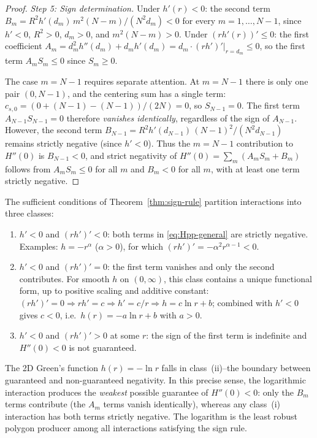 \begin{proof}
\emph{Step 5: Sign determination.}
Under $h'(r) < 0$: the second term
$B_m = R^2 h'(d_m)\,m^2(N{-}m)/(N^2 d_m) < 0$
for every $m = 1, \ldots, N-1$, since $h' < 0$, $R^2 > 0$, $d_m > 0$,
and $m^2(N{-}m) > 0$.
Under $(rh'(r))' \le 0$: the first coefficient
$A_m = d_m^2 h''(d_m) + d_m h'(d_m) = d_m \cdot (rh')'\big|_{r=d_m} \le 0$,
so the first term $A_m S_m \le 0$ since $S_m \ge 0$.

The case $m = N{-}1$ requires separate attention.
At $m = N{-}1$ there is only one pair $(0, N{-}1)$, and the
centering sum has a single term:
$c_{s,0} = (0 + (N{-}1) - (N{-}1))/(2N) = 0$,
so $S_{N-1} = 0$.  The first term $A_{N-1} S_{N-1} = 0$ therefore
\emph{vanishes identically}, regardless of the sign of $A_{N-1}$.
However, the second term
$B_{N-1} = R^2 h'(d_{N-1})\,(N{-}1)^2/(N^2 d_{N-1})$
remains strictly negative (since $h' < 0$).  Thus the $m = N{-}1$
contribution to $H''(0)$ is $B_{N-1} < 0$, and strict negativity
of $H''(0) = \sum_m (A_m S_m + B_m)$ follows from $A_m S_m \le 0$
for all $m$ and $B_m < 0$ for all $m$, with at least one term
strictly negative.
\end{proof}

\begin{remark}
\label{rem:borderline}
The sufficient conditions of Theorem~\ref{thm:sign-rule} partition
interactions into three classes:
\begin{enumerate}
  \item[(i)] $h' < 0$ and $(rh')' < 0$: both terms in
    \eqref{eq:Hpp-general} are strictly negative.
    Examples: $h = -r^\alpha$ ($\alpha > 0$), for which
    $(rh')' = -\alpha^2 r^{\alpha-1} < 0$.
  \item[(ii)] $h' < 0$ and $(rh')' = 0$: the first term vanishes
    and only the second contributes.  For smooth $h$ on $(0,\infty)$,
    this class contains a unique functional form, up to positive
    scaling and additive constant:
    $(rh')' = 0 \Rightarrow rh' = c \Rightarrow h' = c/r
    \Rightarrow h = c\ln r + b$; combined with $h' < 0$ gives
    $c < 0$, i.e.\ $h(r) = -a\ln r + b$ with $a > 0$.
  \item[(iii)] $h' < 0$ and $(rh')' > 0$ at some $r$: the sign of
    the first term is indefinite and $H''(0) < 0$ is not guaranteed.
\end{enumerate}
The 2D Green's function $h(r) = -\ln r$ falls in class~(ii)--the
boundary between guaranteed and non-guaranteed negativity.  In this
precise sense, the logarithmic interaction produces the \emph{weakest}
possible guarantee of $H''(0) < 0$: only the $B_m$ terms contribute
(the $A_m$ terms vanish identically), whereas any class~(i)
interaction has both terms strictly negative.  The logarithm is the
least robust polygon producer among all interactions satisfying the
sign rule.
\end{remark}


